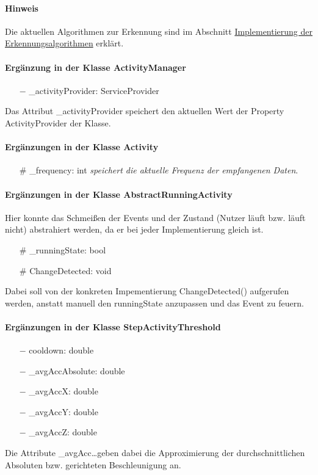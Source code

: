 \documentclass[a4paper,12pt]{article}
\begin{document}
\paragraph{Hinweis}
Die aktuellen Algorithmen zur Erkennung sind im Abschnitt \hyperref[algorithmen]{Implementierung der Erkennungsalgorithmen} erklärt.
\paragraph{Ergänzung in der Klasse ActivityManager}
\begin{itemize}
	\item [$-$]\_activityProvider: ServiceProvider 
\end{itemize}
Das Attribut \_activityProvider speichert den aktuellen Wert der Property ActivityProvider der Klasse.
\paragraph{Ergänzungen in der Klasse Activity}
\begin{itemize}
	\item [\#] \_frequency: int \textit{speichert die aktuelle Frequenz der empfangenen Daten}.
\end{itemize}
\paragraph{Ergänzungen in der Klasse AbstractRunningActivity}
Hier konnte das Schmeißen der Events und der Zustand (Nutzer läuft bzw. läuft nicht) abstrahiert werden, da er bei jeder Implementierung gleich ist.
\begin{itemize}
	\item [\#] \_runningState: bool
	\item [\#] ChangeDetected: void 
\end{itemize}
Dabei soll von der konkreten Impementierung ChangeDetected() aufgerufen werden, anstatt manuell den runningState anzupassen und das Event zu feuern.
\paragraph{Ergänzungen in der Klasse StepActivityThreshold}
\begin{itemize}
	\item [$-$] cooldown: double
	\item [$-$] \_avgAccAbsolute: double
	\item [$-$] \_avgAccX: double
	\item [$-$] \_avgAccY: double
	\item [$-$] \_avgAccZ: double
\end{itemize}
Die Attribute \_avgAcc\dots geben dabei die Approximierung der durchschnittlichen Absoluten bzw. gerichteten Beschleunigung an.
\end{document}
